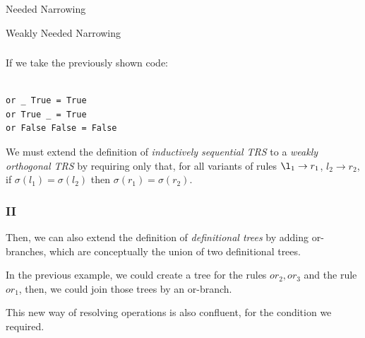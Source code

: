 \documentclass{beamer}
\begin{document}
\begin{section}{Needed Narrowing}
\begin{subsection}{Weakly Needed Narrowing}

\begin{frame}[fragile]
\frametitle{\subsecname}
  If we take the previously shown code:
\begin{verbatim}

or _ True = True
or True _ = True
or False False = False

\end{verbatim}

 We must extend the definition of \textit{inductively sequential TRS} to a \textit{weakly orthogonal TRS} by requiring only that, for all variants of rules $\l_1 \rightarrow r_1$, $l_2 \rightarrow r_2$, if $\sigma(l_1) = \sigma(l_2)$ then $\sigma(r_1) = \sigma(r_2)$.

\end{frame}

\begin{frame}
\frametitle{{\subsecname} II}
  Then, we can also extend the definition of \textit{definitional trees} by adding or-branches, which are conceptually the union of two definitional trees.

  In the previous example, we could create a tree for the rules {$or_2,or_3$} and the rule {$or_1$}, then, we could join those trees by an or-branch.

  This new way of resolving operations is also confluent, for the condition we required.

  \end{frame}
\end{subsection}
\end{section}
\end{document}
